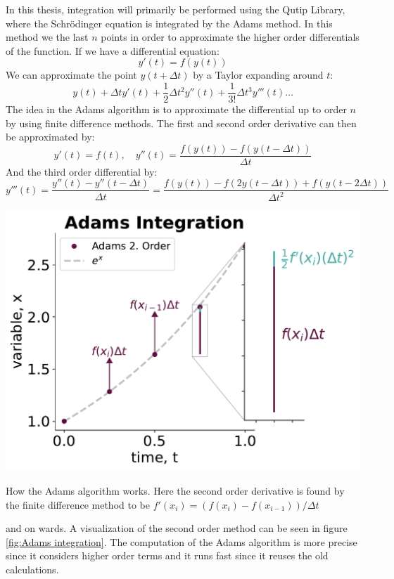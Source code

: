In this thesis, integration will primarily be performed using the Qutip Library\cite{johansson_qutip_2012}, where the Schrödinger equation is integrated by the Adams method. In this method we the last $n$ points in order to  approximate the higher order differentials of the function. If we have a differential equation:
\begin{equation}
    y'(t) = f(y(t))
\end{equation}
We can approximate the point $y(t+\Delta t)$ by a Taylor expanding around $t$:
\begin{equation}
    y(t) + \Delta t y'(t) + \frac12 \Delta t^2 y''(t) + \frac{1}{3!} \Delta t^3 y'''(t)\dots 
\end{equation}
The idea in the Adams algorithm is to approximate the differential up to order $n$ by using finite difference methods. The first and second order derivative can then be approximated by:
\begin{equation}
    y'(t) = f(t), \quad y''(t) = \frac{f(y(t)) - f(y(t - \Delta t))}{\Delta t} 
\end{equation}
And the third order differential by:
\begin{equation}
    y'''(t) = \frac{y''(t) - y''(t-\Delta t)}{\Delta t} = \frac{f(y(t)) - f(2y(t-\Delta t)) + f(y(t-2\Delta t))}{\Delta t^2}
\end{equation}
\begin{marginfigure}
    \centering
    \includegraphics[width = 1.2 \linewidth]{Figs/Theory/adams_intergation.pdf}
    \caption{How the Adams algorithm works. Here the second order derivative is found by the finite difference method to be $f'(x_i) = (f(x_i) - f(x_{i-1}))/\Delta t$}
    \label{fig:Adams integration}
\end{marginfigure}
and on wards. A visualization of the second order method can be seen in figure \ref{fig:Adams integration}. The computation of the Adams algorithm is more precise since it considers higher order terms and it runs fast since it reuses the old calculations. 

